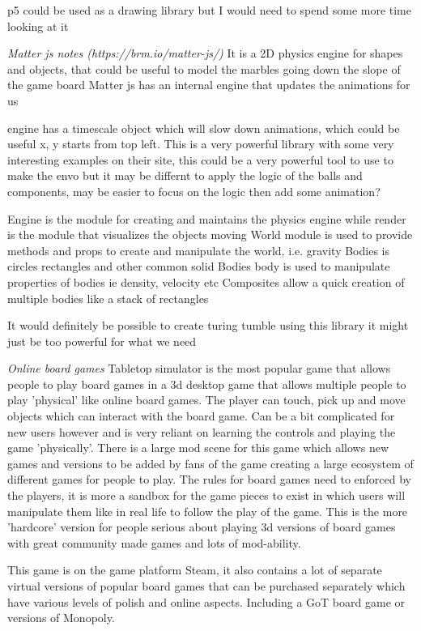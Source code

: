 \documentclass{l4proj}
\begin{document}
p5 could be used as a drawing library but I would need to spend some more time looking at it

\emph{Matter js notes (https://brm.io/matter-js/)}
It is a 2D physics engine for shapes and objects, that could be useful to model the marbles going down the slope of the game board
Matter js has an internal engine that updates the animations for us

engine has a timescale object which will slow down animations, which could be useful
x, y starts from top left.
This is a very powerful library with some very interesting examples on their site, this could be a very powerful tool to use to make the envo but it may be differnt to apply the logic of the balls and components, may be easier to 
focus on the logic then add some animation?

Engine is the module for creating and maintains the physics engine while render is the module that visualizes the objects moving
World module is used to provide methods and props to create and manipulate the world, i.e. gravity
Bodies is circles rectangles and other common solid Bodies
body is used to manipulate properties of bodies ie density, velocity etc
Composites allow a quick creation of multiple bodies like a stack of rectangles 

It would definitely be possible to create turing tumble using this library it might just be too powerful for what we need 

\emph{Online board games}
Tabletop simulator is the most popular game that allows people to play board games in a 3d desktop game that allows multiple people to play 'physical' like online board games.
The player can touch, pick up and move objects which can interact with the board game. Can be a bit complicated for new users however and is very reliant on learning the controls and 
playing the game 'physically'. There is a large mod scene for this game which allows new games and versions to be added by fans of the game creating a large ecosystem of different games for people to play.
The rules for board games need to enforced by the players, it is more a sandbox for the game pieces to exist in which users will manipulate them like in real life to follow the play of the game.
This is the more 'hardcore' version for people serious about playing 3d versions of board games with great community made games and lots of mod-ability.

This game is on the game platform Steam, it also contains a lot of separate virtual versions of popular board games that can be purchased separately which have various levels of polish and online aspects.
Including a GoT board game or versions of Monopoly.
\end{document}
